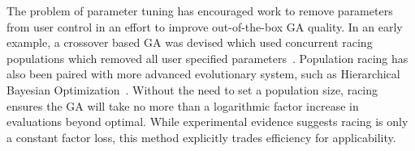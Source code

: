\documentclass{sig-alternate}
\begin{document}
\begin{comment}
Often built into the design of a genetic algorithm (GA) are
evolutionary parameters which allow the user to tune the optimizer's
assumptions to match a specific problem.  These parameters can allow
a GA to more efficiently search the problem's landscape.  However, to
do so the user must first determine how to correctly \textbf{tune} the
parameters, typically a complex and time consuming process unto
itself.

Some considerable work has been devoted to understanding how to tune
these parameters. Early work in Evolutionary Strategies introduced the
concept of self-adaptive evolution which was subsequently introduced
to genetic algorithms~\cite{Back:1992:selfadapt}. Here, each solution
carries some of the parameters used and those parameters are adapted
along with the solution they are co-encoded with. Other work introduced the concept
of a \emph{meta} algorithm~\cite{grefenstette:1986:optimalga}. Here a
second optimizer runs ``on top'' of the actual problem-solving
optimizer, the second slowly tuning the parameters of the first. Both
of these approaches are rather slow, in particular the meta
approach, as actual problem solving must occur at set levels to give
feedback as to how to change the parameters (online or to the meta
optimizer). 

Many parameters have ``reasonable'' settings that are
unlikely to effect the order of complexity of a genetic algorithm,
with population size being a notable exception. For example, an overly small
population can cause exponential search times, while arbitrarily large
population sizes can lead to wasted evaluations and stalled search.
More importantly, setting the population size correctly relies on
difficult to discern features of each problem. 
Goldberg~\cite{goldberg:1991:gasize} showed that small
population sizes were not capable of finding good solutions, though
some practitioners~\cite{haupt:2000:optimum} have found that small
populations with a large mutation rate are effective on some practical
problems.
\end{comment}

The problem of parameter tuning has encouraged work to remove parameters from
user control in an effort to improve out-of-the-box GA quality. In
an early example, a crossover based GA was devised which used
concurrent racing populations which removed all user specified
parameters~\cite{harik:1999:parameterlessga}.
Population racing has also been paired with more advanced evolutionary
system, such as Hierarchical Bayesian
Optimization~\cite{pelikan:2004:parameterlesshboa}.
Without the need to set a population size, racing ensures the GA will take no more than
a logarithmic factor increase in evaluations beyond optimal.
While experimental evidence suggests racing is only a constant
factor loss, this method explicitly trades efficiency for applicability.
\end{document}
